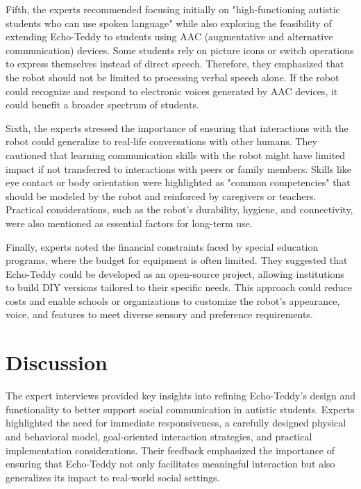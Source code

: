 Fifth, the experts recommended focusing initially on "high-functioning autistic students who can use spoken language" while also exploring the feasibility of extending Echo-Teddy to students using AAC (augmentative and alternative communication) devices. Some students rely on picture icons or switch operations to express themselves instead of direct speech. Therefore, they emphasized that the robot should not be limited to processing verbal speech alone. If the robot could recognize and respond to electronic voices generated by AAC devices, it could benefit a broader spectrum of students.

Sixth, the experts stressed the importance of ensuring that interactions with the robot could generalize to real-life conversations with other humans. They cautioned that learning communication skills with the robot might have limited impact if not transferred to interactions with peers or family members. Skills like eye contact or body orientation were highlighted as "common competencies" that should be modeled by the robot and reinforced by caregivers or teachers. Practical considerations, such as the robot’s durability, hygiene, and connectivity, were also mentioned as essential factors for long-term use.

Finally, experts noted the financial constraints faced by special education programs, where the budget for equipment is often limited. They suggested that Echo-Teddy could be developed as an open-source project, allowing institutions to build DIY versions tailored to their specific needs. This approach could reduce costs and enable schools or organizations to customize the robot’s appearance, voice, and features to meet diverse sensory and preference requirements.


\section{Discussion}

The expert interviews provided key insights into refining Echo-Teddy’s design and functionality to better support social communication in autistic students. Experts highlighted the need for immediate responsiveness, a carefully designed physical and behavioral model, goal-oriented interaction strategies, and practical implementation considerations. Their feedback emphasized the importance of ensuring that Echo-Teddy not only facilitates meaningful interaction but also generalizes its impact to real-world social settings.

